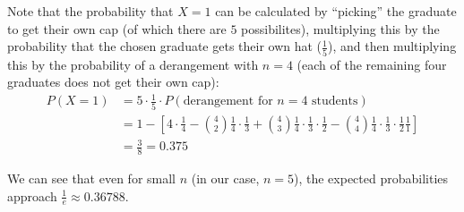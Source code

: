 \begin{enumerate}
    Note that the probability that $X=1$ can be calculated by ``picking'' the graduate to get their own cap (of which there are $5$ possibilites),
    multiplying this by the probability that the chosen graduate gets their own hat ($\frac{1}{5}$), and then multiplying this by the probability of a derangement with $n=4$ (each of the
    remaining four graduates does not get their own cap):
    \begin{align*}
        P(X = 1) &= 5 \cdot \frac{1}{5} \cdot P(\text{derangement for } n = 4 \text{ students}) \\
        &= 1 - \left[ 4 \cdot \frac{1}{4} - \binom{4}{2}\frac{1}{4} \cdot \frac{1}{3} + 
        \binom{4}{3}\frac{1}{4} \cdot \frac{1}{3} \cdot \frac{1}{2} - \binom{4}{4}\frac{1}{4} \cdot \frac{1}{3} \cdot \frac{1}{2} \frac{1}{1}\right] \\
        &= \frac{3}{8} = 0.375
    \end{align*}

    We can see that even for small $n$ (in our case, $n=5$), the expected probabilities approach $\frac{1}{e} \approx 0.36788$.

\end{enumerate}
